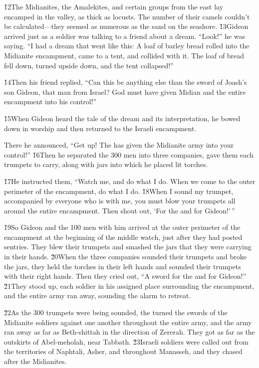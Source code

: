 \v{12}The Midianites, the Amalekites, and certain groups from the east lay encamped in the valley, as thick as locusts. The number of their camels couldn't be calculated---they seemed as numerous as the sand on the seashore. \v{13}Gideon arrived just as a soldier was talking to a friend about a dream. ``Look!'' he was saying. ``I had a dream that went like this: A loaf of barley bread rolled into the Midianite encampment, came to a tent, and collided with it. The loaf of bread fell down, turned upside down, and the tent collapsed!''

\v{14}Then his friend replied, ``Can this be anything else than the sword of Joash's son Gideon, that man from Israel? God must have given Midian and the entire encampment into his control!''

\v{15}When Gideon heard the tale of the dream and its interpretation, he bowed down in worship and then returned to the Israeli encampment.

There he announced, ``Get up! The  has given the Midianite army into your control!'' \v{16}Then he separated the 300 men into three companies, gave them each trumpets to carry, along with jars into which he placed lit torches.

\v{17}He instructed them, ``Watch me, and do what I do. When we come to the outer perimeter of the encampment, do what I do. \v{18}When I sound my trumpet, accompanied by everyone who is with me, you must blow your trumpets all around the entire encampment. Then shout out, `For the  and for Gideon!'\,''

\v{19}So Gideon and the 100 men with him arrived at the outer perimeter of the encampment at the beginning of the middle watch, just after they had posted sentries. They blew their trumpets and smashed the jars that they were carrying in their hands. \v{20}When the three companies sounded their trumpets and broke the jars, they held the torches in their left hands and sounded their trumpets with their right hands. Then they cried out, ``A sword for the  and for Gideon!'' \v{21}They stood up, each soldier in his assigned place surrounding the encampment, and the entire army ran away, sounding the alarm to retreat.

\v{22}As the 300 trumpets were being sounded, the  turned the swords of the Midianite soldiers against one another throughout the entire army, and the army ran away as far as Beth-shittah in the direction of Zererah. They got as far as the outskirts of Abel-meholah, near Tabbath. \v{23}Israeli soldiers were called out from the territories of Naphtali, Asher, and throughout Manasseh, and they chased after the Midianites.

